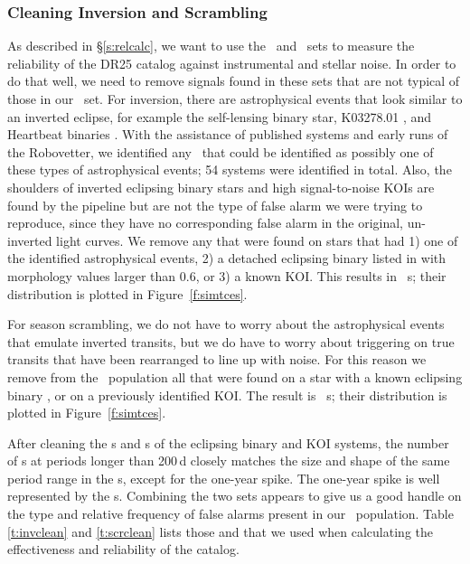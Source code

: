 \subsubsection{Cleaning Inversion and Scrambling}
\label{s:clean}
As described in \S\ref{s:relcalc}, we want to use the \invtce\ and \scrtce\ sets to measure the reliability of the DR25 catalog against instrumental and stellar noise. In order to do that well, we need to remove signals found in these sets that are not typical of those in our \opstce\ set. For inversion, there are astrophysical events that look similar to an inverted eclipse, for example the self-lensing binary star, K03278.01 \citep{Kruse2014}, and Heartbeat binaries \citep{Thompson2012}. With the assistance of published systems and early runs of the Robovetter, we identified any \invtce\ that could be identified as possibly one of these types of astrophysical events; 54 systems were identified in total. Also, the shoulders of inverted eclipsing binary stars and high signal-to-noise KOIs are found by the pipeline but are not the type of false alarm we were trying to reproduce, since they have no corresponding false alarm in the original, un-inverted light curves. We remove any  that were found on stars that had 1) one of the identified astrophysical events, 2) a detached eclipsing binary listed in \citet{Kirk2016} with morphology values larger than 0.6, or 3) a known KOI.  This results in \ninvtces\ \invtce s; their distribution is plotted in Figure~\ref{f:simtces}.

For season scrambling, we do not have to worry about the astrophysical events that emulate inverted transits, but we do have to worry about triggering on true transits that have been rearranged to line up with noise. For this reason we remove from the \scrtce\ population all that were found on a star with a known eclipsing binary \citep{Kirk2016}, or on a previously identified KOI. The result is \nscrtces\ \scrtce s; their distribution is plotted in Figure~\ref{f:simtces}. 

After cleaning the \invtce s and \scrtce s of the eclipsing binary and KOI systems, the number of \scrtce s at periods longer than 200\,d closely matches the size and shape of the same period range in the \opstce s, except for the one-year spike.  The one-year spike is well represented by the \invtce s.  Combining the two sets appears to give us a good handle on the type and relative frequency of false alarms present in our \opstce\ population. Table\,\ref{t:invclean} and \ref{t:scrclean} lists those  and  that we used when calculating the effectiveness and reliability of the catalog.

